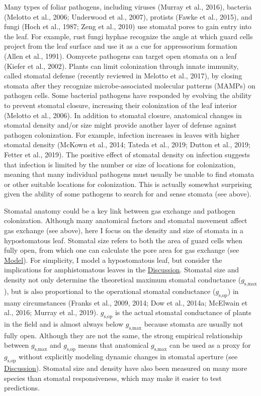 \documentclass[utf8]{frontiersSCNS}
\newcommand{\gsmax}{$g_\text{s,max}$}
\newcommand{\gsop}{$g_\text{s,op}$}
\begin{document}
Many types of foliar pathogens, including viruses (Murray et al., 2016),
bacteria (Melotto et al., 2006; Underwood et al., 2007), protists (Fawke
et al., 2015), and fungi (Hoch et al., 1987; Zeng et al., 2010) use
stomatal pores to gain entry into the leaf. For example, rust fungi
hyphae recognize the angle at which guard cells project from the leaf
surface and use it as a cue for appressorium formation (Allen et al.,
1991). Oomycete pathogens can target open stomata on a leaf (Kiefer et
al., 2002). Plants can limit colonization through innate immunity,
called stomatal defense (recently reviewed in Melotto et al., 2017), by
closing stomata after they recognize microbe-associated molecular
patterns (MAMPs) on pathogen cells. Some bacterial pathogens have
responded by evolving the ability to prevent stomatal closure,
increasing their colonization of the leaf interior (Melotto et al.,
2006). In addition to stomatal closure, anatomical changes in stomatal
density and/or size might provide another layer of defense against
pathogen colonization. For example, infection increases in leaves with
higher stomatal density (McKown et al., 2014; Tateda et al., 2019;
Dutton et al., 2019; Fetter et al., 2019). The positive effect of
stomatal density on infection suggests that infection is limited by the
number or size of locations for colonization, meaning that many
individual pathogens must usually be unable to find stomata or other
suitable locations for colonization. This is actually somewhat
surprising given the ability of some pathogens to search for and sense
stomata (see above).

Stomatal anatomy could be a key link between gas exchange and pathogen
colonization. Although many anatomical factors and stomatal movement
affect gas exchange (see above), here I focus on the density and size of
stomata in a hypostomatous leaf. Stomatal size refers to both the area
of guard cells when fully open, from which one can calculate the pore
area for gas exchange (see \protect\hyperlink{model}{Model}). For
simplicity, I model a hypostomatous leaf, but consider the implications
for amphistomatous leaves in the
\protect\hyperlink{discussion}{Discussion}. Stomatal size and density
not only determine the theoretical maximum stomatal conductance
(\gsmax), but is also proportional to the operational stomatal
conductance (\gsop) in many circumstances (Franks et al., 2009, 2014;
Dow et al., 2014a; McElwain et al., 2016; Murray et al., 2019). \gsop{}
is the actual stomatal conductance of plants in the field and is almost
always below \gsmax{} because stomata are usually not fully open.
Although they are not the same, the strong empirical relationship
between \gsmax{} and \gsop{} means that anatomical \gsmax{} can be used
as a proxy for \gsop{} without explicitly modeling dynamic changes in
stomatal aperture (see \protect\hyperlink{discussion}{Discussion}).
Stomatal size and density have also been measured on many more species
than stomatal responsiveness, which may make it easier to test
predictions.
\end{document}
